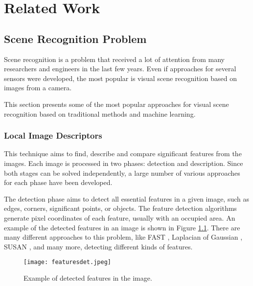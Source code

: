 \chapter{Related Work}\label{chapter:relatedWork}

\section{Scene Recognition Problem}\label{section:sceneRecognitionProblem}

Scene recognition is a problem that received a lot of attention from many researchers and engineers in the last few years. Even if approaches for several sensors were developed, the most popular is visual scene recognition based on images from a camera.\par
This section presents some of the most popular approaches for visual scene recognition based on traditional methods and machine learning.

\subsection{Local Image Descriptors}\label{section:localImageDescriptors}

This technique aims to find, describe and compare significant features from the images. Each image is processed in two phases: detection and description. Since both stages can be solved independently, a large number of various approaches for each phase have been developed.\par
The detection phase aims to detect all essential features in a given image, such as edges, corners, significant points, or objects. The feature detection algorithms generate pixel coordinates of each feature, usually with an occupied area. An example of the detected features in an image is shown in Figure \ref{fig:featuresDetection}. There are many different approaches to this problem, like FAST \parencite{FAST}, Laplacian of Gaussian \parencite{LaplacianOfGaussian}, SUSAN \parencite{SUSAN}, and many more, detecting different kinds of features.\par

\begin{figure}[htpb]
    \centering
    \texttt{[image: featuresdet.jpeg]}
    \caption{Example of detected features in the image. \cite{featuresImg}} \label{fig:featuresDetection}
\end{figure}

